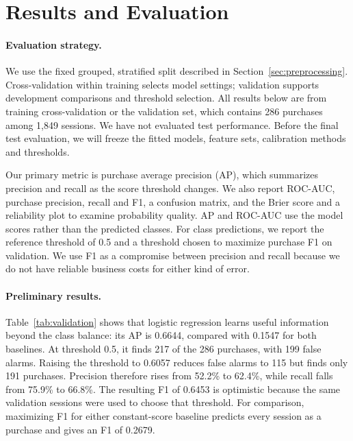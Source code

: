 \documentclass[11pt]{article}
\begin{document}
\section{Results and Evaluation}
\label{sec:results}

\paragraph{Evaluation strategy.} We use the fixed grouped, stratified split
described in Section~\ref{sec:preprocessing}. Cross-validation within training selects model
settings; validation supports development comparisons and threshold
selection. All results below are from training cross-validation or the
validation set, which contains 286 purchases among 1,849 sessions. We have
not evaluated test performance. Before the final test evaluation, we will
freeze the fitted models, feature sets, calibration methods and thresholds.

Our primary metric is purchase average precision (AP), which summarizes
precision and recall as the score threshold changes. We also report ROC-AUC,
purchase precision, recall and F1, a confusion matrix, and the Brier score
and a reliability plot to examine probability quality. AP and ROC-AUC use
the model scores rather than the predicted classes. For class predictions,
we report the reference threshold of 0.5 and a threshold chosen to maximize
purchase F1 on validation. We use F1 as a compromise between precision and
recall because we do not have reliable business costs for either kind of
error.



\paragraph{Preliminary results.} Table~\ref{tab:validation} shows that logistic
regression learns useful information beyond the class balance: its AP is
0.6644, compared with 0.1547 for both baselines. At threshold 0.5, it finds
217 of the 286 purchases, with 199 false alarms. Raising the threshold to
0.6057 reduces false alarms to 115 but finds only 191 purchases. Precision
therefore rises from 52.2\% to 62.4\%, while recall falls from 75.9\% to
66.8\%. The resulting F1 of 0.6453 is optimistic because the same validation
sessions were used to choose that threshold. For comparison, maximizing F1
for either constant-score baseline predicts every session as a purchase and
gives an F1 of 0.2679.
\end{document}
